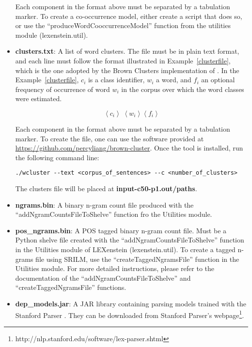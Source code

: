 \begin{itemize}
Each component in the format above must be separated by a tabulation marker. To create a co-occurrence model, either create a script that does so, or use the ``produceWordCooccurrenceModel'' function from the utilities module (lexenstein.util).
	
	\item \textbf{clusters.txt}: A list of word clusters. The file must be in plain text format, and each line must follow the format illustrated in Example~\ref{clusterfile}, which is the one adopted by the Brown Clusters implementation of \cite{brownclusters}. In the Example~\ref{clusterfile}, $c_{i}$ is a class identifier, $w_{i}$ a word, and $f_{i}$ an optional frequency of occurrence of word $w_{i}$ in the corpus over which the word classes were estimated.

\begin{equation}
\label{clusterfile}
\left\langle c_{i} \right\rangle\; \left\langle w_{i} \right\rangle \left\langle f_{i} \right\rangle
\end{equation}

Each component in the format above must be separated by a tabulation marker. To create the file, one can use the software provided at \url{https://github.com/percyliang/brown-cluster}. Once the tool is installed, run the following command line:

\begin{lstlisting}
./wcluster --text <corpus_of_sentences> --c <number_of_clusters>
\end{lstlisting}

The clusters file will be placed at \textbf{input-c50-p1.out/paths}.
	
	\item \textbf{ngrams.bin}: A binary n-gram count file produced with the ``addNgramCountsFileToShelve'' function fro the Utilities module.
	
	\item \textbf{pos\_ngrams.bin}: A POS tagged binary n-gram count file. Must be a Python shelve file created with the ``addNgramCountsFileToShelve'' function in the Utilities module of LEXenstein (lexenstein.util). To create a tagged n-grams file using SRILM, use the ``createTaggedNgramsFile'' function in the Utilities module. For more detailed instructions, please refer to the documentation of the ``addNgramCountsFileToShelve'' and ``createTaggedNgramsFile'' functions.
	
	\item \textbf{dep\_models.jar}: A JAR library containing parsing models trained with the Stanford Parser \cite{stanfordparser}. They can be downloaded from Stanford Parser's webpage\footnote{http://nlp.stanford.edu/software/lex-parser.shtml}.
	

\end{itemize}
